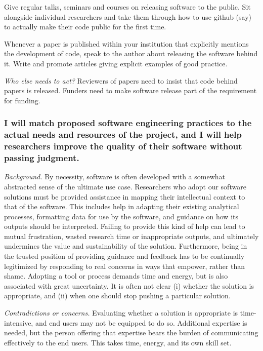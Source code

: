 \documentclass[a4paper,UKenglish]{dagman}
\renewcommand{\paragraph}[1]{\subsubsection*{#1}\xspace}
\begin{document}
Give regular talks, seminars and courses on releasing software to the public.
Sit alongside individual researchers and take them through how to use github (say) to actually make their code public for the first time.

Whenever a paper is published within your institution that explicitly mentions the development of code, speak to the author about releasing the software behind it. Write and promote articles giving explicit examples of good practice.



\emph{Who else needs to act?}
Reviewers of papers need to insist that code behind papers is released. Funders need to make software release part of the requirement for funding.

\paragraph{I will match proposed software engineering practices to the actual needs and resources of the project, and I will help researchers improve the quality of their software without passing judgment.}


\emph{Background.}
By necessity, software is often developed with a somewhat abstracted sense of the ultimate use case. Researchers who adopt our software solutions must be provided assistance in mapping their intellectual context to that of the software. This includes help in adapting their existing analytical processes, formatting data for use by the software, and guidance on how its outputs should be interpreted. Failing to provide this kind of help can lead to mutual frustration, wasted research time or inappropriate outputs, and ultimately undermines the value and sustainability of the solution. Furthermore, being in the trusted position of providing guidance and feedback has to be continually legitimized by responding to real concerns in ways that empower, rather than shame. Adopting a tool or process demands time and energy, but is also associated with great uncertainty. It is often not clear (i) whether the solution is appropriate, and (ii) when one should stop pushing a particular solution.

\emph{Contradictions or concerns.}
Evaluating whether a solution is appropriate is time-intensive, and end users may not be equipped to do so. Additional expertise is needed, but the person offering that expertise bears the burden of communicating effectively to the end users. This takes time, energy, and its own skill set.
\end{document}
